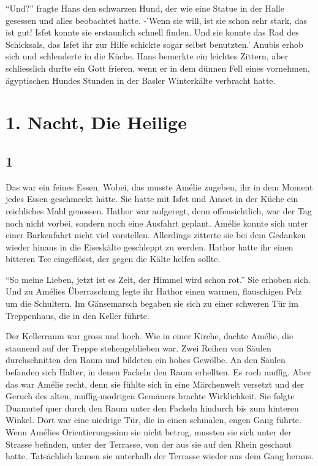 \documentclass[11pt,titlepage,a5paper]{book}
\begin{document}
"`Und?"' fragte Hans den schwarzen Hund, der wie eine Statue in der Halle gesessen und alles beobachtet hatte. -'Wenn sie will, ist sie schon sehr stark, das ist gut! Isfet konnte sie erstaunlich schnell finden. Und sie konnte das Rad des Schicksals, das Isfet ihr zur Hilfe schickte sogar selbst benutzten.' Anubis erhob sich und schlenderte in die Küche. Hans bemerkte ein leichtes Zittern, aber schliesslich durfte ein Gott frieren, wenn er in dem dünnen Fell eines vornehmen, ägyptischen Hundes Stunden in der Basler Winterkälte verbracht hatte.

\chapter*{1. Nacht, Die Heilige}

\section*{1}

Das war ein feines Essen. Wobei, das musste Amélie zugeben, ihr in dem Moment jedes Essen geschmeckt hätte. Sie hatte mit Isfet und Amset in der Küche ein reichliches Mahl genossen. Hathor war aufgeregt, denn offensichtlich, war der Tag noch nicht vorbei, sondern noch eine Ausfahrt geplant. Amélie konnte sich unter einer Barkenfahrt nicht viel vorstellen. Allerdings zitterte sie bei dem Gedanken wieder hinaus in die Eiseskälte geschleppt zu werden. Hathor hatte ihr einen bitteren Tee eingeflösst, der gegen die Kälte helfen sollte.

"`So meine Lieben, jetzt ist es Zeit, der Himmel wird schon rot."' Sie erhoben sich. Und zu Amélies Überraschung legte ihr Hathor einen warmen, flauschigen Pelz um die Schultern. Im Gänsemarsch begaben sie sich zu einer schweren Tür im Treppenhaus, die in den Keller führte. 

Der Kellerraum war gross und hoch. Wie in einer Kirche, dachte Amélie, die staunend auf der Treppe stehengeblieben war. Zwei Reihen von Säulen durchschnitten den Raum und bildeten ein hohes Gewölbe. An den Säulen befanden sich Halter, in denen Fackeln den Raum erhellten. Es roch muffig. Aber das war Amélie recht, denn sie fühlte sich in eine Märchenwelt versetzt und der Geruch des alten, muffig-modrigen Gemäuers brachte Wirklichkeit. Sie folgte Duamutef quer durch den Raum unter den Fackeln hindurch bis zum hinteren Winkel. Dort war eine niedrige Tür, die in einen schmalen, engen Gang führte. Wenn Amélies Orientierungssinn sie nicht betrog, mussten sie sich unter der Strasse befinden, unter der Terrasse, von der aus sie auf den Rhein geschaut hatte. Tatsächlich kamen sie unterhalb der Terrasse wieder aus dem Gang heraus. 
\end{document}
